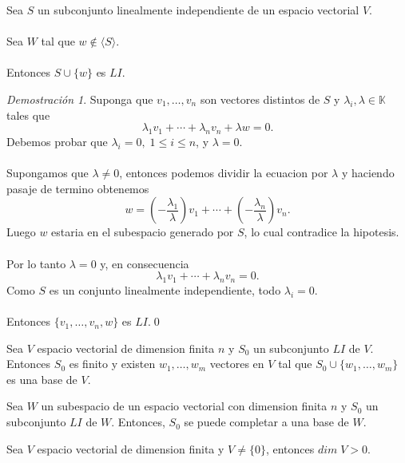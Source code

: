 \documentclass{article}
\theoremstyle{definition}
\theoremstyle{definition}
\theoremstyle{remark}
\newtheorem*{demo}{Demostración}
\begin{document}
\begin{lema}
  Sea $S$ un subconjunto linealmente independiente de un espacio vectorial $V$. \\\\ Sea $W$ tal que $w \notin \langle S \rangle $. \\\\ Entonces $S \cup \{w\}$ es $LI$.
\end{lema}
\begin{demo}
  Suponga que $v_1, \dots , v_n$ son vectores distintos de $S$ y $\lambda_i, \lambda \in \mathbb{K}$ tales que \begin{equation}
    \lambda_{1}v_1+ \cdots + \lambda_nv_n+\lambda w = 0. \tag{1}
\end{equation}
  Debemos probar que $\lambda_i = 0, \; 1 \leq i \leq n$, y $\lambda=0$.\\\\
  Supongamos que $\lambda \neq 0$, entonces podemos dividir la ecuacion por $\lambda$ y haciendo pasaje de termino obtenemos \[
    w=\left(-\frac{\lambda_1}{\lambda}\right)v_1 + \cdots +\left(-\frac{\lambda_n}{\lambda}\right)v_n.
  \]
  Luego $w$ estaria en el subespacio generado por $S$, lo cual contradice la hipotesis. \\\\ Por lo tanto $\lambda=0$ y, en consecuencia \[
    \lambda_1v_1+\cdots + \lambda_{n}v_n=0.
  \]
  Como $S$ es un conjunto linealmente independiente, todo $\lambda_i=0$. \\\\ Entonces $\{v_1, \dots ,v_n, w\}$ es $LI$.\qed
\end{demo}
\begin{teo}
 Sea $V$ espacio vectorial de dimension finita $n$ y $S_0$ un subconjunto $LI$ de $V$. Entonces $S_0$ es finito y existen $w_1, \dots ,w_m$ vectores en $V$ tal que $S_0 \cup \{w_1, \dots , w_m\}$ es una base de $V$.
\end{teo}
\begin{corol}
Sea $W$ un subespacio de un espacio vectorial con dimension finita $n$ y $S_0$ un subconjunto $LI$ de $W$. Entonces, $S_0$ se puede completar a una base de $W$. 
\end{corol}
\begin{corol}
  Sea $V$ espacio vectorial de dimension finita y $V \neq \{0\}$, entonces $dim \; V>0$.
\end{corol}\pagebreak
\end{document}
